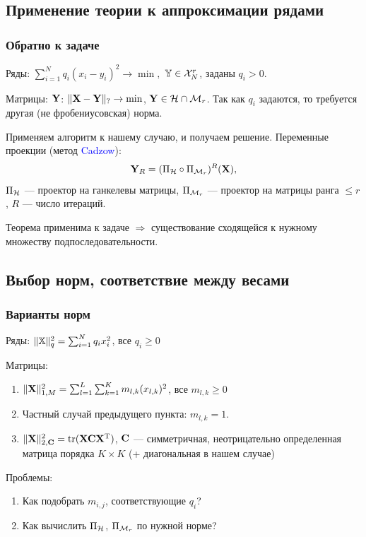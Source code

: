 \documentclass[unicode, notheorems]{beamer}
\begin{document}
\subsection{Применение теории к аппроксимации рядами}
\begin{frame}
	\frametitle{Обратно к задаче}
	Ряды: $\sum \limits_{i=1}^N q_i(x_i - y_i)^2 \to \min,$ $\mathbb{Y} \in \mathcal{X}_N^r$, заданы $q_i > 0$.
	
	Матрицы: $\mathbf{Y}$: $\|\mathbf{X} - \mathbf{Y}\|_? \to \min$, $\mathbf{Y} \in \mathcal{H} \cap \mathcal{M}_r$. Так как $q_i$ задаются, то требуется другая (не фробениусовская)  норма.
	
	\vspace{0.3cm}
	Применяем алгоритм к нашему случаю, и получаем решение. Переменные проекции (метод \textcolor{blue}{Cadzow}): 
	\begin{equation*}
	\mathbf{Y}_R = (\Pi_{\mathcal{H}} \circ \Pi_{\mathcal{M}_r})^R (\mathbf{X}),
	\end{equation*}
	$\Pi_{\mathcal{H}}$ --- проектор на ганкелевы матрицы, $\Pi_{\mathcal{M}_r}$ --- проектор на матрицы ранга $\le r$, $R$ --- число итераций.
	
	Теорема применима к задаче $\Rightarrow$ существование сходящейся к нужному множеству подпоследовательности.
\end{frame}

\subsection{Выбор норм, соответствие между весами}
\begin{frame}
	\frametitle{Варианты норм}
	Ряды:
	$\|\mathbb{X}\|_q^2 = \sum_{i = 1}^N q_i x_i^2$, все $q_i \ge 0$
	
	\vspace{0.4cm}
	Матрицы:
		\begin{enumerate}
			\item $\|\mathbf{X}\|_{1, M}^2 = \sum_{l = 1}^L \sum_{k = 1}^K m_{l, k} (x_{l, k})^2$, все $m_{l, k} \ge 0$
			\item Частный случай предыдущего пункта: $m_{l, k} = 1$.
			\item $\|\mathbf{X}\|_{2, \mathbf{C}}^2 = \text{tr}(\mathbf{X} \mathbf{C} \mathbf{X}^{\mathrm{T}})$, $\mathbf{C}$ --- симметричная, неотрицательно определенная матрица порядка $K \times K$ (+ диагональная в нашем случае)
		\end{enumerate}
		
		\vspace{0.4cm}
		Проблемы:
		\begin{enumerate}
			\item Как подобрать $m_{i, j}$, соответствующие $q_i$?
			\item Как вычислить $\Pi_{\mathcal{H}}$, $\Pi_{\mathcal{M}_r}$ по нужной норме?
		\end{enumerate}
\end{frame}
\end{document}

